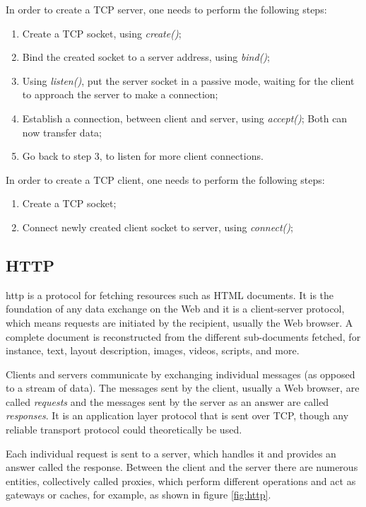 In order to create a TCP server, one needs to perform the following steps:
\begin{enumerate}
	\item Create a TCP socket, using \textit{create()};
	\item Bind the created socket to a server address, using \textit{bind()};
	\item Using \textit{listen()}, put the server socket in a passive mode, waiting for the client to approach the server to make a connection;
	\item Establish a connection, between client and server, using \textit{accept()}; Both can now transfer data;
	\item Go back to step 3, to listen for more client connections.	
\end{enumerate}


In order to create a TCP client, one needs to perform the following steps:
\begin{enumerate}
	\item Create a TCP socket;
	\item Connect newly created client socket to server, using \textit{connect()};
\end{enumerate}

\clearpage
\subsection{HTTP}
\ac{http} is a protocol for fetching resources such as HTML documents. It is the foundation of any data exchange on the Web and it is a client-server protocol, which means requests are initiated by the recipient, usually the Web browser. A complete document is reconstructed from the different sub-documents fetched, for instance, text, layout description, images, videos, scripts, and more. \cite{http}

Clients and servers communicate by exchanging individual messages (as opposed to a stream of data). The messages sent by the client, usually a Web browser, are called \textit{requests} and the messages sent by the server as an answer are called \textit{responses}. It is an application layer protocol that is sent over TCP, though any reliable transport protocol could theoretically be used. 

Each individual request is sent to a server, which handles it and provides an answer called the response. Between the client and the server there are numerous entities, collectively called proxies, which perform different operations and act as gateways or caches, for example, as shown in figure \ref{fig:http}.

